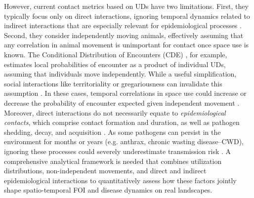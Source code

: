 \documentclass[letterpaper]{article}
\begin{document}
However, current contact metrics based on UDs have two limitations. First, they typically focus only on direct interactions, ignoring temporal dynamics related to indirect interactions that are especially relevant for epidemiological processes \citep{Yang2023}. Second, they consider independently moving animals, effectively assuming that any correlation in animal movement is unimportant for contact once space use is known. The Conditional Distribution of Encounters (CDE) \citep{Noonan2021}, for example, estimates local probabilities of encounter as a product of individual UDs, assuming that individuals move independently.
While a useful simplification, social interactions like territoriality or gregariousness can invalidate this assumption \citep{Manlove2018,Sah2018}. In these cases, temporal correlations in space use could increase or decrease the probability of encounter expected given independent movement \citep{Kjaer2008,Schauber2015a}. 
Moreover, direct interactions do not necessarily equate to \emph{epidemiological contacts}, which comprise contact formation and duration, as well as pathogen shedding, decay, and acquisition \citep{Herraiz2024}. As some pathogens can persist in the environment for months or years (e.g. anthrax, chronic wasting disease--CWD), ignoring these processes could severely underestimate transmission risk \citep{Wilber2022,Yang2023,Richardson2015}.  A comprehensive analytical framework is needed that combines utilization distributions, non-independent movements, and direct and indirect epidemiological interactions to quantitatively assess how these factors jointly shape spatio-temporal FOI and disease dynamics on real landscapes.

\end{document}
